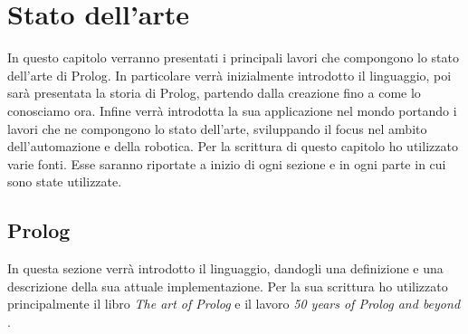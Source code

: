 \chapter{Stato dell'arte}
\label{cha:statoarte}
In questo capitolo verranno presentati i principali lavori che compongono lo stato
dell'arte di Prolog. In particolare verrà inizialmente introdotto il linguaggio, poi sarà presentata la storia di Prolog, partendo dalla creazione
fino a come lo conosciamo ora. Infine verrà introdotta la sua applicazione nel mondo portando i lavori che ne compongono lo stato dell'arte, sviluppando il focus nel ambito dell'automazione e della robotica.
Per la scrittura di questo capitolo ho utilizzato varie fonti. Esse saranno riportate a inizio di ogni sezione e in ogni parte in cui sono state utilizzate.
\section{Prolog}
\label{sec:prolog}
In questa sezione verrà introdotto il linguaggio, dandogli una definizione e una descrizione della sua attuale implementazione. Per la sua scrittura ho utilizzato principalmente il libro \textit{The art of Prolog} \cite{krause_1995} e il lavoro \textit{50 years of Prolog and beyond} \cite{korner2022fifty}.

